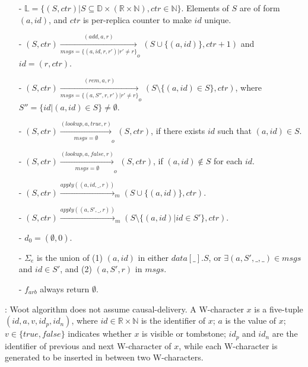 {\color {red}
\begin{itemize}
\setlength{\itemsep}{0.5pt}
\item[-] $\mathbb{L} = \{ (S,\mathit{ctr}) \vert S \subseteq \mathbb{D} \times (\mathbb{R} \times \mathbb{N}), \mathit{ctr} \in \mathbb{N} \}$. Elements of $S$ are of form $(a,id)$, and $\mathit{ctr}$ is per-replica counter to make $id$ unique. 

\item[-] $(S,\mathit{ctr}) \xrightarrow[\mathit{msgs} = \{ (a,\mathit{id},r,r') \vert r' \neq r \}]{(\mathit{add},a,r)}_o (S \cup \{ (a,\mathit{id}) \}, \mathit{ctr}+1)$ and $\mathit{id} = (r,\mathit{ctr})$. 

\item[-] $(S,\mathit{ctr}) \xrightarrow[\mathit{msgs} = \{ (a,S'',r,r') \vert r' \neq r \} ]{(\mathit{rem},a,r)}_o (S \setminus \{ (a,id) \in S \}, \mathit{ctr})$, where $S'' = \{ id \vert (a,id) \in S \} \neq \emptyset$. 

\item[-] $(S,\mathit{ctr}) \xrightarrow[\mathit{msgs} = \emptyset]{(\mathit{lookup},a,\mathit{true},r)}_o (S, \mathit{ctr})$, if there exists $\mathit{id}$ such that $(a,\mathit{id}) \in S$. 

\item[-] $(S,\mathit{ctr}) \xrightarrow[\mathit{msgs} = \emptyset]{(\mathit{lookup},a,\mathit{false},r)}_o (S, \mathit{ctr})$, if $(a,\mathit{id}) \notin S$ for each $\mathit{id}$. 

\item[-] $(S,\mathit{ctr}) \xrightarrow{\mathit{apply}((a,id,\_,r))}_m (S \cup \{ (a,id) \}, \mathit{ctr})$. 

\item[-] $(S,\mathit{ctr}) \xrightarrow{\mathit{apply}((a,S',\_,r))}_m (S \setminus \{ (a,id) \vert id \in S' \}, \mathit{ctr})$. 

\item[-] $d_0 = (\emptyset,0)$.

\item[-] $\Sigma_e$ is the union of (1) $(a,id)$ in either $\mathit{data}[\_].S$, or $\exists (a,S',\_,\_) \in \mathit{msgs}$ and $id \in S'$, and (2) $(a,S',r)$ in $\mathit{msgs}$. 

\item[-] $f_{\mathit{arb}}$ always return $\emptyset$.
\end{itemize}
} 



: Woot algorithm does not assume causal-delivery. A W-character $x$ is a five-tuple $(\mathit{id},a,v,\mathit{id}_p,\mathit{id}_n)$, where $\mathit{id} \in \mathbb{R} \times \mathbb{N}$ is the identifier of $x$; $a$ is the value of $x$; $v \in \{ \mathit{true},\mathit{false} \}$ indicates whether $x$ is visible or tombstone; $\mathit{id}_p$ and $\mathit{id}_n$ are the identifier of previous and next W-character of $x$, while each W-character is generated to be inserted in between two W-characters. 

